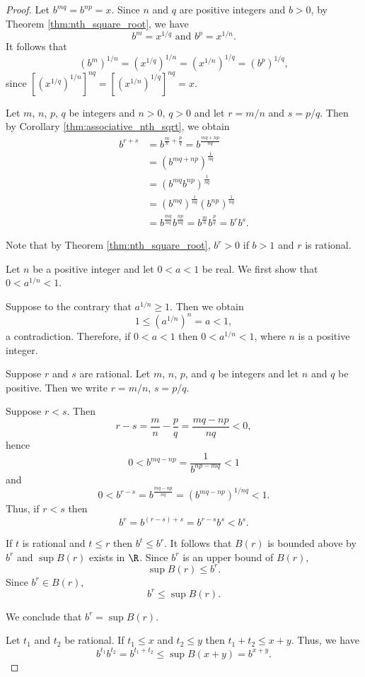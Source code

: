 \begin{proof}
\item[(a)]
Let $b^{mq}=b^{np}=x$.
Since $n$ and $q$ are positive integers and $b>0$, by Theorem \ref{thm:nth_square_root}, we have 
\[
b^m=x^{1/q} \text{ and } b^p=x^{1/n}.
\]
It follows that
\[
(b^m)^{1/n}=(x^{1/q})^{1/n}=(x^{1/n})^{1/q}=(b^p)^{1/q},
\]
since $[(x^{1/q})^{1/n}]^{nq}=[(x^{1/n})^{1/q}]^{nq}=x$.
\item[(b)]Let $m$, $n$, $p$, $q$ be integers and $n>0$, $q>0$ and let $r=m/n$ and $s=p/q$. 
Then by Corollary \ref{thm:associative_nth_sqrt}, we obtain
\begin{align*}
b^{r+s}
&=b^{\frac{m}{n}+\frac{p}{q}}
=b^{\frac{mq+np}{nq}}\\
&=\left(b^{mq+np}\right)^{\frac{1}{nq}}\\
&=\left(b^{mq}b^{np}\right)^{\frac{1}{nq}}\\
&=\left(b^{mq}\right)^{\frac{1}{nq}} \left(b^{np}\right)^{\frac{1}{nq}}\\
&=b^{\frac{mq}{nq}} b^{\frac{np}{nq}}
=b^{\frac{m}{n}} b^{\frac{p}{q}}
=b^rb^s.
\end{align*}
\item[(c)]
Note that by Theorem \ref{thm:nth_square_root}, $b^r>0$ if $b>1$ and $r$ is rational.

Let $n$ be a positive integer and let $0<a<1$ be real. We first show that $0<a^{1/n}<1$.

Suppose to the contrary that $a^{1/n} \geq 1$. Then we obtain 
\[
1 \leq \left(a^{1/n}\right)^n=a<1,
\]
a contradiction. Therefore, if $0<a<1$ then $0<a^{1/n}<1$, where $n$ is a positive integer.

Suppose $r$ and $s$ are rational. 
Let $m$, $n$, $p$, and $q$ be integers and let $n$ and $q$ be positive.
Then we write $r=m/n$, $s=p/q$.

Suppose $r<s$. Then
\[
r-s =\frac{m}{n}-\frac{p}{q} =\frac{mq-np}{nq} <0,
\]
hence
\[
0 < b^{mq-np} = \frac{1}{b^{np-mq}} < 1
\]
and 
\[
0 < b^{r-s} = b^{\frac{mq-np}{nq}} = \left(b^{mq-np}\right)^{1/nq} < 1.
\]
Thus, if $r<s$ then
\[
b^r = b^{(r-s)+s} = b^{r-s}b^s < b^s.
\]

If $t$ is rational and $t \leq r$ then $b^t \leq b^r$. 
It follows that $B(r)$ is bounded above by $b^r$ and $\sup B(r)$ exists in $\R$.
Since $b^r$ is an upper bound of $B(r)$, 
\[
\sup B(r) \leq b^r.
\]
Since $b^r \in B(r)$,
\[
b^r \leq \sup B(r).
\]

We conclude that $b^r = \sup B(r)$.

\item[(d)]
Let $t_1$ and $t_2$ be rational. 
If $t_1 \leq x$ and $t_2 \leq y$ then $t_1+t_2 \leq x+y$.
Thus, we have
\[
b^{t_1}b^{t_2} = b^{t_1+t_2} \leq \sup B(x+y) =b^{x+y}.
\]


\end{proof}
